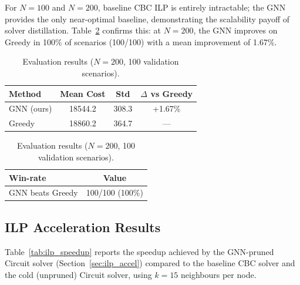 \documentclass[conference]{IEEEtran}
\begin{document}
For $N{=}100$ and $N{=}200$, baseline CBC ILP is entirely intractable; the GNN provides the only near-optimal baseline, demonstrating the scalability payoff of solver distillation. Table~\ref{tab:results_200obj} confirms this: at $N{=}200$, the GNN improves on Greedy in 100\% of scenarios (100/100) with a mean improvement of 1.67\%.

\begin{table}[htbp]
\caption{Evaluation results ($N{=}200$, 100 validation scenarios).}
\label{tab:results_200obj}
\centering
\begin{tabular}{@{}lccc@{}}
\toprule
\textbf{Method} & \textbf{Mean Cost} & \textbf{Std} & \textbf{$\Delta$ vs Greedy} \\
\midrule
GNN (ours) & 18544.2 & 308.3 & +1.67\% \\
Greedy & 18860.2 & 364.7 & \multicolumn{1}{c}{---} \\
\bottomrule
\end{tabular}

\vspace{2mm}
\begin{tabular}{@{}lc@{}}
\toprule
\textbf{Win-rate} & \textbf{Value} \\
\midrule
GNN beats Greedy & 100/100 (100\%) \\
\bottomrule
\end{tabular}
\end{table}

\subsection{ILP Acceleration Results}\label{sec:ilp_accel_results}

Table~\ref{tab:ilp_speedup} reports the speedup achieved by the GNN-pruned Circuit solver (Section~\ref{sec:ilp_accel}) compared to the baseline CBC solver and the cold (unpruned) Circuit solver, using $k{=}15$ neighbours per node.
\end{document}
